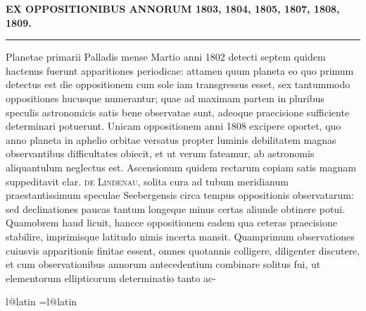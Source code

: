 \begingroup
\pagestyle{empty}
\vspace*{.132\textheight}
{\centering
{\fontsize{9.6}{12}\selectfont\bfseries{}\par}
\vspace{7pt}
{\fontsize{11.65}{14.5}\selectfont\bfseries{}\par}
\vspace{8pt}
{\fontsize{6.85}{9}\selectfont\bfseries
EX OPPOSITIONIBUS ANNORUM 1803, 1804, 1805, 1807, 1808, 1809.\par}
\vspace{15pt}
\rule{.09\linewidth}{.3pt}\par
}
\nobreak\vspace{18pt}
\fontsize{10.4}{14.5}\selectfont
\setlength{\parindent}{2.55em}
Planetae primarii Palladis mense Martio anni 1802 detecti septem quidem hactenus fuerunt apparitiones periodicae: attamen quum planeta eo quo primum detectus est die oppositionem cum sole iam transgressus esset, sex tantummodo oppositiones hucusque numerantur; quae ad maximam partem in pluribus speculis astronomicis satis bene observatae sunt, adeoque praecisione sufficiente determinari potuerunt. Unicam oppositionem anni 1808 excipere oportet, quo anno planeta in aphelio orbitae versatus propter luminis debilitatem magnas observantibus difficultates obiecit, et ut verum fateamur, ab astronomis aliquantulum neglectus est. Ascensionum quidem rectarum copiam satis magnam suppeditavit clar. \textsc{de Lindenau}, solita cura ad tubum meridianum praestantissimum speculae Seebergensis circa tempus oppositionis observatarum: sed declinationes paucas tantum longeque minus certas aliunde obtinere potui. Quamobrem haud licuit, hancce oppositionem eadem qua ceteras praecisione stabilire, imprimisque latitudo nimis incerta mansit.
Quamprimum observationes cuiusvis apparitionis finitae essent, omnes quotannis colligere, diligenter discutere, et cum observationibus annorum antecedentium combinare solitus fui, ut elementorum ellipticorum determinatio tanto ac-\par
\nobreak\smallskip
\noindent\makebox[\linewidth][r]{%
  {\footnotesize\bfseries 1\textsuperscript{*}}\hspace*{.174\linewidth}}\par
\clearpage
\endgroup
\clearpage
\begingroup
\pagestyle{empty}
\ifcsname l@latin\endcsname
  \language=\csname l@latin\endcsname\relax
